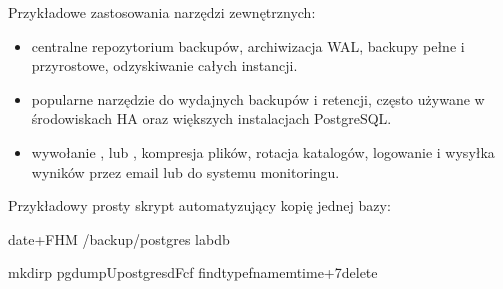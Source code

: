 \documentclass[letterpaper,10pt,polish]{sphinxmanual}
\begin{document}
\sphinxAtStartPar
Przykładowe zastosowania narzędzi zewnętrznych:
\begin{itemize}
\item {} 
\sphinxAtStartPar
{} centralne repozytorium backupów, archiwizacja WAL, backupy pełne i przyrostowe, odzyskiwanie całych instancji.

\item {} 
\sphinxAtStartPar
{} popularne narzędzie do wydajnych backupów i retencji, często używane w środowiskach HA oraz większych instalacjach PostgreSQL.

\item {} 
\sphinxAtStartPar
{} wywołanie ,  lub , kompresja plików, rotacja katalogów, logowanie i wysyłka wyników przez e\sphinxhyphen{}mail lub do systemu monitoringu.

\end{itemize}

\sphinxAtStartPar
Przykładowy prosty skrypt automatyzujący kopię jednej bazy:

\begin{sphinxVerbatim}[commandchars=\\\{\}]
date+\PYGZpc{}F\PYGZus{}\PYGZpc{}H\PYGZhy{}\PYGZpc{}M
/backup/postgres
labdb

mkdir\PYGZhy{}p
pg\PYGZus{}dump\PYGZhy{}Upostgres\PYGZhy{}d\PYGZhy{}Fc\PYGZhy{}f
find\PYGZhy{}typef\PYGZhy{}name\PYGZhy{}mtime+7\PYGZhy{}delete
\end{sphinxVerbatim}
\end{document}
